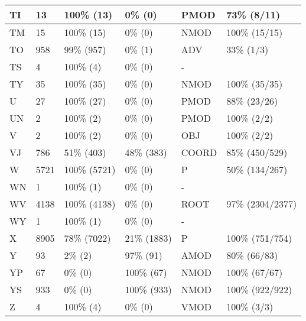 \begin{figure*}
\begin{tabular}{|l|l|l|l||l|l|}
\hline
 TI & 13 & 100\% (13) & 0\% (0) & PMOD & 73\% (8/11) \\ 
\hline
 TM & 15 & 100\% (15) & 0\% (0) & NMOD & 100\% (15/15) \\ 
\hline
 TO & 958 & 99\% (957) & 0\% (1) & ADV & 33\% (1/3) \\ 
\hline
 TS & 4 & 100\% (4) & 0\% (0) & - &  \\ 
\hline
 TY & 35 & 100\% (35) & 0\% (0) & NMOD & 100\% (35/35) \\ 
\hline
 U & 27 & 100\% (27) & 0\% (0) & PMOD & 88\% (23/26) \\ 
\hline
 UN & 2 & 100\% (2) & 0\% (0) & PMOD & 100\% (2/2) \\ 
\hline
 V & 2 & 100\% (2) & 0\% (0) & OBJ & 100\% (2/2) \\ 
\hline
 VJ & 786 & 51\% (403) & 48\% (383) & COORD & 85\% (450/529) \\ 
\hline
 W & 5721 & 100\% (5721) & 0\% (0) & P & 50\% (134/267) \\ 
\hline
 WN & 1 & 100\% (1) & 0\% (0) & - &  \\ 
\hline
 WV & 4138 & 100\% (4138) & 0\% (0) & ROOT & 97\% (2304/2377) \\ 
\hline
 WY & 1 & 100\% (1) & 0\% (0) & - &  \\ 
\hline
 X & 8905 & 78\% (7022) & 21\% (1883) & P & 100\% (751/754) \\ 
\hline
 Y & 93 & 2\% (2) & 97\% (91) & AMOD & 80\% (66/83) \\ 
\hline
 YP & 67 & 0\% (0) & 100\% (67) & NMOD & 100\% (67/67) \\ 
\hline
 YS & 933 & 0\% (0) & 100\% (933) & NMOD & 100\% (922/922) \\ 
\hline
 Z & 4 & 100\% (4) & 0\% (0) & VMOD & 100\% (3/3) \\ 
\hline
\end{tabular}
\end{figure*}
